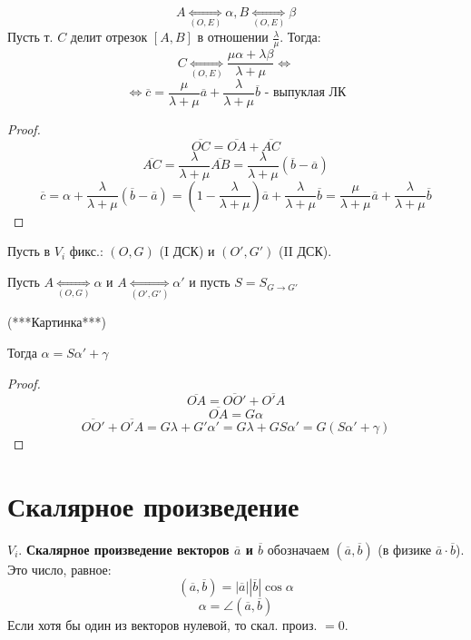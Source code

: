 \begin{statement}
    \[
    A \underset{(O, E)}{\Longleftrightarrow}\alpha, B \underset{(O, E)}{\Longleftrightarrow} \beta
    \] 
    Пусть т. $C$ делит отрезок $[A, B]$ в отношении $\frac{\lambda}{\mu}$. Тогда:
    \[
        C \underset{(O, E)}{\Longleftrightarrow} \frac{\mu\alpha + \lambda \beta}{\lambda + \mu} \iff
    \] 
    \[
        \iff \overline{c} = \frac{\mu}{\lambda + \mu} \overline{a} + \frac{\lambda}{\lambda + \mu} \overline{b} \text{ - выпуклая ЛК}
    \] 

\end{statement}
\begin{proof}
    \[
    \overline{OC} = \overline{OA} + \overline{AC}
    \] 
    \[
    \overline{AC} = \frac{\lambda}{\lambda + \mu} \overline{AB} = \frac{\lambda}{\lambda + \mu}(\overline{b} - \overline{a})
    \] 
    \[
    \overline{c} = \alpha + \frac{\lambda}{\lambda + \mu} (\overline{b} - \overline{a}) = (1 - \frac{\lambda}{\lambda + \mu}) \overline{a} + \frac{\lambda}{\lambda + \mu} \overline{b} = \frac{\mu}{\lambda + \mu} \overline{a} + \frac{\lambda}{\lambda + \mu} \overline{b}
    \] 
\end{proof}
\begin{theorem} 
Пусть в $V_i$ фикс.: $(O, G)$ (I ДСК) и $(O', G')$ (II ДСК).

Пусть $A \underset{(O, G)}{\Longleftrightarrow} \alpha$ и $A \underset{(O', G')}{\Longleftrightarrow} \alpha'$ и пусть $S = S_{G \to G'}$

(***Картинка***)

Тогда $\alpha = S\alpha' + \gamma$
\end{theorem}
\begin{proof}
\[
\overline{OA} = \overline{OO'} + \overline{O'A}
\] 
\[
\overline{OA} = G \alpha
\] 
\[
\overline{OO'} + \overline{O'A} = G \lambda + G' \alpha' = G \lambda + GS \alpha' = G(S\alpha' + \gamma)
\] 
\end{proof}
\section{Скалярное произведение}

\begin{definition}
$V_i$. \textbf{Скалярное произведение векторов $\overline{a}$ и $\overline{b}$} обозначаем $(\overline{a}, \overline{b})$ (в физике $\overline{a} \cdot \overline{b}$). Это число, равное:
\[
    (\overline{a}, \overline{b}) = |\overline{a}||\overline{b}|\cos \alpha
\] 
\[
\alpha = \angle (\overline{a}, \overline{b})
\] 
Если хотя бы один из векторов нулевой, то скал. произ. $ = 0$.
\end{definition}

